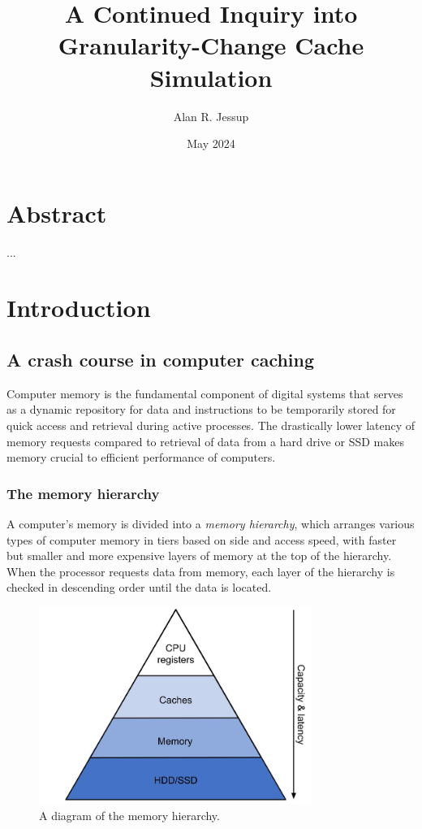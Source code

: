 \documentclass[12pt,twoside]{reedthesis}
\title{A Continued Inquiry into Granularity-Change Cache Simulation}
\author{Alan R. Jessup}
\date{May 2024}
\begin{document}
\maketitle
\frontmatter %
\pagestyle{empty}

\tableofcontents

\chapter*{Abstract}

...

\mainmatter
\pagestyle{fancyplain}

\chapter{Introduction}

\section{A crash course in computer caching}

Computer memory is the fundamental component of digital systems that serves as a dynamic repository for data and instructions to be temporarily stored for quick access and retrieval during active processes. The drastically lower latency of memory requests compared to retrieval of data from a hard drive or SSD makes memory crucial to efficient performance of computers.

	\subsection*{The memory hierarchy}

	A computer's memory is divided into a \textit{memory hierarchy}, which arranges various types of computer memory in tiers based on side and access speed, with faster but smaller and more expensive layers of memory at the top of the hierarchy. When the processor requests data from memory, each layer of the hierarchy is checked in descending order until the data is located.

	\begin{figure}[h]
    	\centering
    	\includegraphics[width=3.5in]{figures/mem_hierarchy.jpg}
    	\caption{A diagram of the memory hierarchy.}
	\end{figure}
\end{document}
